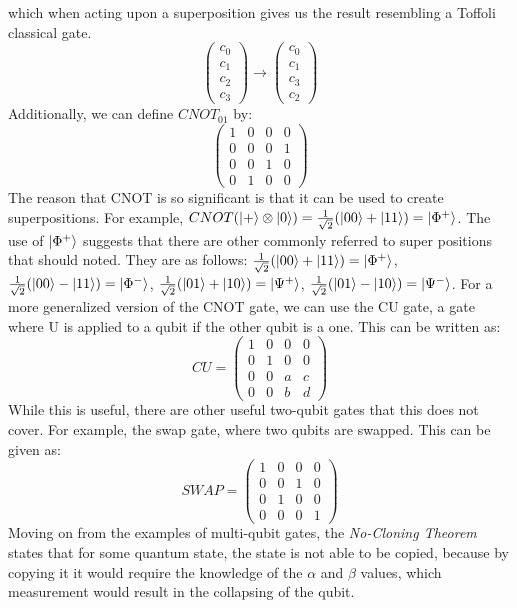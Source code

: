 \documentclass{article}
\begin{document}
which when acting upon a superposition gives us the result resembling a Toffoli classical gate.
\[
    \begin{pmatrix}
        c_0 \\
        c_1 \\
        c_2 \\
        c_3
    \end{pmatrix}
    \xrightarrow{}
    \begin{pmatrix}
        c_0 \\
        c_1 \\
        c_3 \\
        c_2
    \end{pmatrix}
\]
Additionally, we can define $CNOT_{01}$ by:
\[
    \begin{pmatrix}
        1 & 0 & 0 & 0 \\
        0 & 0 & 0 & 1 \\
        0 & 0 & 1 & 0 \\
        0 & 1 & 0 & 0 
    \end{pmatrix}
\]
The reason that CNOT is so significant is that it can be used to create superpositions. For example, $CNOT(\ket{+}\otimes\ket{0}) = \frac{1}{\sqrt{2}}(\ket{00} + \ket{11}) = \ket{\Phi^+}$. The use of $\ket{\Phi^+}$ suggests that there are other commonly referred to super positions that should noted. They are as follows: $\frac{1}{\sqrt{2}}(\ket{00} + \ket{11}) = \ket{\Phi^+}$, $\frac{1}{\sqrt{2}}(\ket{00} - \ket{11}) = \ket{\Phi^-}$, $\frac{1}{\sqrt{2}}(\ket{01} + \ket{10}) = \ket{\Psi^+}$, $\frac{1}{\sqrt{2}}(\ket{01} - \ket{10}) = \ket{\Psi^-}$. For a more generalized version of the CNOT gate, we can use the CU gate, a gate where U is applied to a qubit if the other qubit is a one. This can be written as:
\[
    CU = 
    \begin{pmatrix}
        1 & 0 & 0 & 0 \\
        0 & 1 & 0 & 0 \\
        0 & 0 & a & c \\
        0 & 0 & b & d
    \end{pmatrix}
\]
While this is useful, there are other useful two-qubit gates that this does not cover. For example, the swap gate, where two qubits are swapped. This can be given as:
\[
    SWAP = 
    \begin{pmatrix}
        1 & 0 & 0 & 0 \\
        0 & 0 & 1 & 0 \\
        0 & 1 & 0 & 0 \\
        0 & 0 & 0 & 1
    \end{pmatrix}
\]
Moving on from the examples of multi-qubit gates, the \textit{No-Cloning Theorem} states that for some quantum state, the state is not able to be copied, because by copying it it would require the knowledge of the $\alpha$ and $\beta$ values, which measurement would result in the collapsing of the qubit.  
\end{document}
